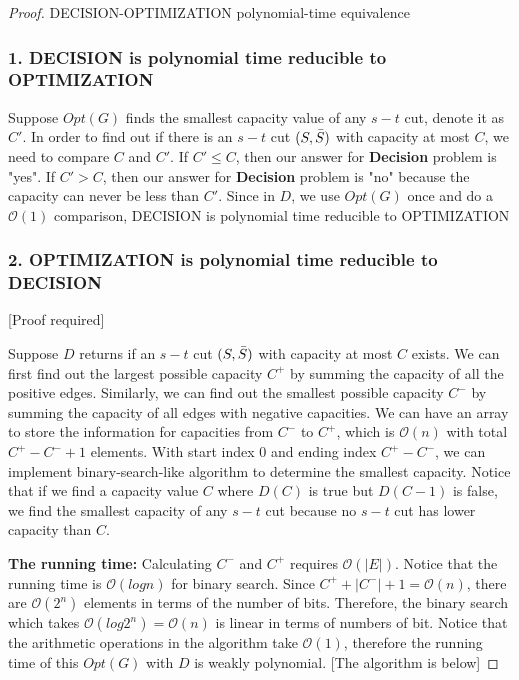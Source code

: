 \documentclass[openany]{article}
\begin{document}
\begin{proof}{}{DECISION-OPTIMIZATION polynomial-time equivalence}
    \subsubsection*{1. DECISION is polynomial time reducible to OPTIMIZATION}

Suppose $Opt(G)$ finds the smallest capacity value of any $s-t$ cut, denote it as $C'$. In order to find out if there is an $s-t$ cut $(S, \Bar{S})$ with capacity at most $C$, we need to compare $C$ and $C'$. If $C' \leqslant C$, then our answer for \textbf{Decision} problem is "yes". If $C' > C$, then our answer for \textbf{Decision} problem is "no" because the capacity can never be less than $C'$. Since in $D$, we use $Opt(G)$ once and do a $\mathcal{O}(1)$ comparison, DECISION is polynomial time reducible to OPTIMIZATION 

\subsubsection*{2. OPTIMIZATION is polynomial time reducible to DECISION}

[Proof required]
  
Suppose $D$ returns if an $s-t$ cut $(S,\Bar{S})$ with capacity at most $C$ exists. We can first find out the largest possible capacity $C^+$ by summing the capacity of all the positive edges. Similarly, we can find out the smallest possible capacity $C^-$ by summing the capacity of all edges with negative capacities. We can have an array to store the information for capacities from $C^-$ to $C^+$, which is $\mathcal{O}(n)$ with total $C^+-C^-+1$ elements. With start index $0$ and ending index $C^+-C^-$, we can implement binary-search-like algorithm to determine the smallest capacity. Notice that if we find a capacity value $C$ where $D(C)$ is true but $D(C-1)$ is false, we find the smallest capacity of any $s-t$ cut because no $s-t$ cut has lower capacity than $C$. 

\textbf{The running time:} Calculating $C^-$ and $C^+$ requires $\mathcal{O}(|E|)$. Notice that the running time is $\mathcal{O}(log n)$ for binary search. Since $C^++|C^-|+1 = \mathcal{O}(n)$, there are $\mathcal{O}(2^n)$ elements in terms of the number of bits. Therefore, the binary search which takes $\mathcal{O}(log{2^n}) = \mathcal{O}(n)$ is linear in terms of numbers of bit. Notice that the arithmetic operations in the algorithm take $\mathcal{O}(1)$, therefore the running time of this $Opt(G)$ with $D$ is weakly polynomial. [The algorithm is below]


\end{proof}
\end{document}
